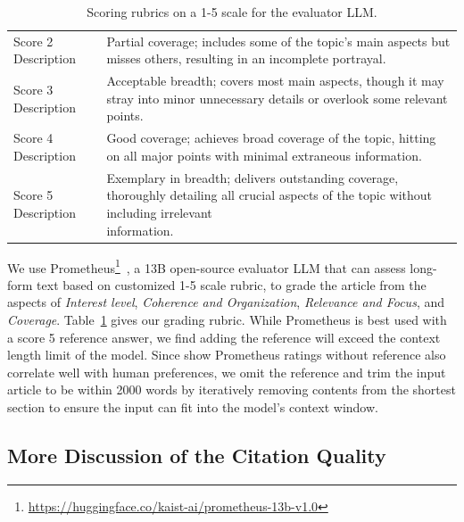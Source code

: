 \documentclass[11pt]{article}
\newcommand{\reftab}[1]{Table~\ref{#1}}
\begin{document}
\begin{table}
{\begin{tabular}{ll}
Score 2 Description  & Partial coverage; includes some of the topic's main aspects but misses others, resulting in an incomplete portrayal.                                                                      \\
Score 3 Description  & Acceptable breadth; covers most main aspects, though it may stray into minor unnecessary details or overlook some relevant points.                                                        \\
Score 4 Description  & Good coverage; achieves broad coverage of the topic, hitting on all major points with minimal extraneous information.                                                                     \\
Score 5 Description  & \makecell[l]{Exemplary in breadth; delivers outstanding coverage, thoroughly detailing all crucial aspects of the topic without including irrelevant \\information.}                                      \\
\bottomrule
\end{tabular}
}
\caption{Scoring rubrics on a 1-5 scale for the evaluator LLM.}
\label{table:rubric}
\end{table}


We use Prometheus\footnote{\url{https://huggingface.co/kaist-ai/prometheus-13b-v1.0}}~\citep{kim2023prometheus}, a 13B open-source evaluator LLM that can assess long-form text based on customized 1-5 scale rubric, to grade the article from the aspects of \textit{Interest level}, \textit{Coherence and Organization}, \textit{Relevance and Focus}, and \textit{Coverage}. \reftab{table:rubric} gives our grading rubric. While Prometheus is best used with a score 5 reference answer, we find adding the reference will exceed the context length limit of the model. Since \citet{kim2023prometheus} show Prometheus ratings without reference also correlate well with human preferences, we omit the reference and trim the input article to be within 2000 words by iteratively removing contents from the shortest section to ensure the input can fit into the model's context window.

\subsection{More Discussion of the Citation Quality}
\label{appendix:citation_quality_discuss}
\end{document}
